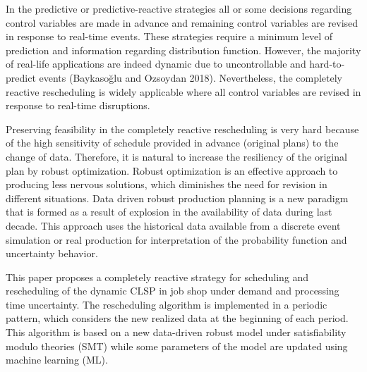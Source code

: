 \documentclass[letterpaper]{article} %
\begin{document}
In the predictive or predictive-reactive strategies all or some decisions regarding control variables are made in advance and remaining control variables are revised in response to real-time events. These strategies require a minimum level of prediction and information regarding distribution function. However, the majority of real-life applications are indeed dynamic due to uncontrollable and hard-to-predict events (Baykasoğlu and Ozsoydan 2018). Nevertheless, the completely reactive rescheduling is widely applicable where all control variables are revised in response to real-time disruptions.

Preserving feasibility in the completely reactive rescheduling is very hard because of the high sensitivity of schedule provided in advance (original plans) to the change of data. Therefore, it is natural to increase the resiliency of the original plan by robust optimization. Robust optimization is an effective approach to producing less nervous solutions, which diminishes the need for revision in different situations.  Data driven robust production planning is a new paradigm that is formed as a result of explosion in the availability of data during last decade. This approach uses the  historical data available from a discrete event simulation or real production for interpretation of the probability function and uncertainty behavior.

This paper proposes a completely reactive strategy for scheduling and rescheduling of the dynamic CLSP in job shop under demand and processing time uncertainty. The rescheduling algorithm is implemented in a periodic pattern, which considers the new realized data at the beginning of each period. This algorithm is based on a new data-driven robust model under satisfiability modulo theories (SMT) while some parameters of the model are updated using  machine learning (ML). 
\end{document}
